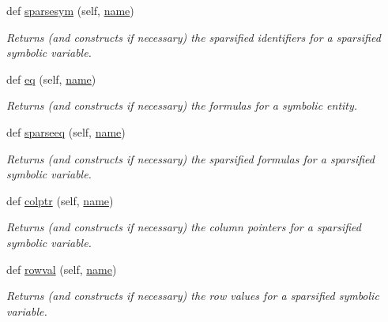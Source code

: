 \begin{DoxyCompactItemize}
def \mbox{\hyperlink{classamici_1_1ode__export_1_1_o_d_e_model_a0a1d830b8c4d1e208e81f48dfea71cf4}{sparsesym}} (self, \mbox{\hyperlink{classamici_1_1ode__export_1_1_o_d_e_model_a4d110acf8e52c4d48044071ea06952c0}{name}})
\begin{DoxyCompactList}\small\item\em Returns (and constructs if necessary) the sparsified identifiers for a sparsified symbolic variable. \end{DoxyCompactList}\item 
def \mbox{\hyperlink{classamici_1_1ode__export_1_1_o_d_e_model_addafc9d839b53dbe76461d8ac6dba604}{eq}} (self, \mbox{\hyperlink{classamici_1_1ode__export_1_1_o_d_e_model_a4d110acf8e52c4d48044071ea06952c0}{name}})
\begin{DoxyCompactList}\small\item\em Returns (and constructs if necessary) the formulas for a symbolic entity. \end{DoxyCompactList}\item 
def \mbox{\hyperlink{classamici_1_1ode__export_1_1_o_d_e_model_ade69c458d3c7069f0b062d796f68d1da}{sparseeq}} (self, \mbox{\hyperlink{classamici_1_1ode__export_1_1_o_d_e_model_a4d110acf8e52c4d48044071ea06952c0}{name}})
\begin{DoxyCompactList}\small\item\em Returns (and constructs if necessary) the sparsified formulas for a sparsified symbolic variable. \end{DoxyCompactList}\item 
def \mbox{\hyperlink{classamici_1_1ode__export_1_1_o_d_e_model_ad478875583922ae8d579486a03107557}{colptr}} (self, \mbox{\hyperlink{classamici_1_1ode__export_1_1_o_d_e_model_a4d110acf8e52c4d48044071ea06952c0}{name}})
\begin{DoxyCompactList}\small\item\em Returns (and constructs if necessary) the column pointers for a sparsified symbolic variable. \end{DoxyCompactList}\item 
def \mbox{\hyperlink{classamici_1_1ode__export_1_1_o_d_e_model_af1c1cc87fcc84bb17f41ee7fabaf795d}{rowval}} (self, \mbox{\hyperlink{classamici_1_1ode__export_1_1_o_d_e_model_a4d110acf8e52c4d48044071ea06952c0}{name}})
\begin{DoxyCompactList}\small\item\em Returns (and constructs if necessary) the row values for a sparsified symbolic variable. \end{DoxyCompactList}\item 

\end{DoxyCompactItemize}
